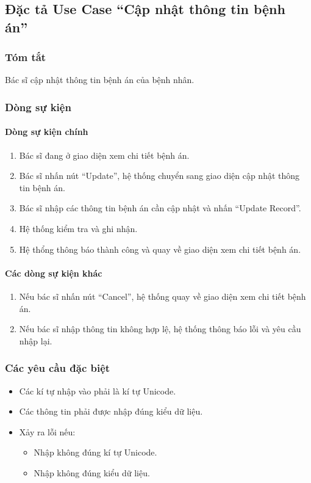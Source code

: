 \subsection{Đặc tả Use Case ``Cập nhật thông tin bệnh án''}

\subsubsection{Tóm tắt}
Bác sĩ cập nhật thông tin bệnh án của bệnh nhân.

\subsubsection{Dòng sự kiện}
\paragraph{\textbf{Dòng sự kiện chính}}
\begin{enumerate}
  \item Bác sĩ đang ở giao diện xem chi tiết bệnh án.
  \item Bác sĩ nhấn nút ``Update'', hệ thống chuyển sang giao diện cập nhật thông tin bệnh án.
  \item Bác sĩ nhập các thông tin bệnh án cần cập nhật và nhấn ``Update Record''.
  \item Hệ thống kiểm tra và ghi nhận.
  \item Hệ thổng thông báo thành công và quay về giao diện xem chi tiết bệnh án.
\end{enumerate}

\paragraph{\textbf{Các dòng sự kiện khác}}
\begin{enumerate}
  \item Nếu bác sĩ nhấn nút ``Cancel'', hệ thống quay về giao diện xem chi tiết bệnh án.
  \item Nếu bác sĩ nhập thông tin không hợp lệ, hệ thống thông báo lỗi và yêu cầu nhập lại.
\end{enumerate}

\subsubsection{Các yêu cầu đặc biệt}
\begin{itemize}
  \item Các kí tự nhập vào phải là kí tự Unicode.
  \item Các thông tin phải được nhập đúng kiểu dữ liệu.
  \item Xảy ra lỗi nếu:
    \begin{itemize}
      \item Nhập không đúng kí tự Unicode.
      \item Nhập không đúng kiểu dữ liệu.
    \end{itemize}
\end{itemize}

